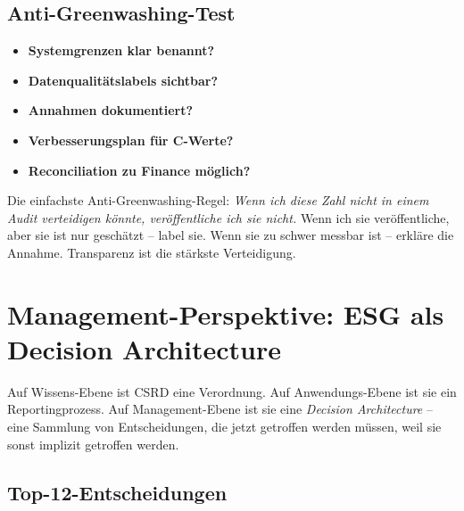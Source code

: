 \documentclass[11pt,a4paper,oneside]{article}
\begin{document}
\subsection{Anti-Greenwashing-Test}

\begin{itemize}
  \item \textbf{Systemgrenzen klar benannt?}
  \item \textbf{Datenqualitätslabels sichtbar?}
  \item \textbf{Annahmen dokumentiert?}
  \item \textbf{Verbesserungsplan für C-Werte?}
  \item \textbf{Reconciliation zu Finance möglich?}
\end{itemize}

\begin{merkbox}
Die einfachste Anti-Greenwashing-Regel: \emph{Wenn ich diese Zahl nicht in einem Audit verteidigen könnte, veröffentliche ich sie nicht.} Wenn ich sie veröffentliche, aber sie ist nur geschätzt -- label sie. Wenn sie zu schwer messbar ist -- erkläre die Annahme. Transparenz ist die stärkste Verteidigung.
\end{merkbox}

\section{Management-Perspektive: ESG als Decision Architecture}

Auf Wissens-Ebene ist CSRD eine Verordnung. Auf Anwendungs-Ebene ist sie ein Reportingprozess. Auf Management-Ebene ist sie eine \emph{Decision Architecture} -- eine Sammlung von Entscheidungen, die jetzt getroffen werden müssen, weil sie sonst implizit getroffen werden.

\subsection{Top-12-Entscheidungen}
\end{document}
